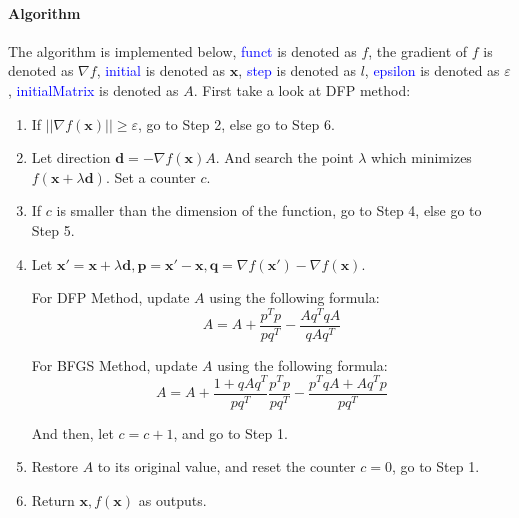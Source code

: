 \documentclass{article}
\begin{document}
\paragraph{Algorithm}
The algorithm is implemented below, \textcolor{blue}{funct} is denoted as $f$, the gradient of $f$ is denoted as $\nabla f$, \textcolor{blue}{initial} is denoted as $\mathbf{x}$, \textcolor{blue}{step} is denoted as $l$, \textcolor{blue}{epsilon} is denoted as $\varepsilon$, \textcolor{blue}{initialMatrix} is denoted as $A$. First take a look at DFP method:

\begin{enumerate}
    \item If $||\nabla f(\mathbf{x})|| \geqslant \varepsilon$, go to Step 2, else go to Step 6.
    \item Let direction $\mathbf{d} = -\nabla f(\mathbf{x}) A$. And search the point $\lambda$ which minimizes $f(\mathbf{x} + \lambda \mathbf{d})$. Set a counter $c$.
    \item If $c$ is smaller than the dimension of the function, go to Step 4, else go to Step 5.
    \item Let $\mathbf{x'} = \mathbf{x} + \lambda \mathbf{d}, \mathbf{p} = \mathbf{x'} - \mathbf{x}, \mathbf{q} = \nabla f(\mathbf{x'}) - \nabla f(\mathbf{x})$. 

    For DFP Method, update $A$ using the following formula:
    \begin{equation*}
        A = A + \frac{p^T p}{p q^T} - \frac{A q^T q A}{q A q^T}
    \end{equation*}

    For BFGS Method, update $A$ using the following formula:
    \begin{equation*}
        A = A + \frac{1 + q A q^T}{p q^T} \frac{p^T p}{p q^T} - \frac{p^T q A + A q^T p}{p q^T}
    \end{equation*}

    And then, let $c = c + 1$, and go to Step 1.
    \item Restore $A$ to its original value, and reset the counter $c = 0$, go to Step 1.
    \item Return $\mathbf{x}, f(\mathbf{x})$ as outputs.
\end{enumerate}
\end{document}
